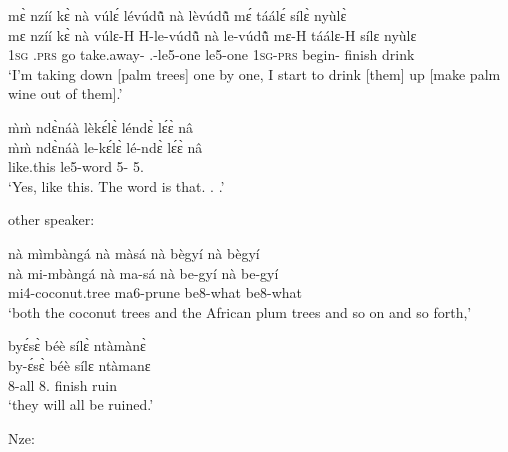 \begin{exe}[(C234)]
\exC\label{78}
  \glll   mɛ̀ nzíí kɛ̀ nà vúlɛ́ lévúdũ̂ nà lèvúdũ̂ mɛ́ táálɛ́ sílɛ̀ nyùlɛ̀ \\
          mɛ nzíí kɛ̀ nà vúlɛ-H H-le-vúdũ̂ nà le-vúdũ̂ mɛ-H táálɛ-H sílɛ nyùlɛ \\
           1\textsc{sg} {\PROG}.\textsc{prs} go {\CONJ} take.away-{\R} {\OBJ}.{\LINK}-le5-one {\COM} le5-one 1\textsc{sg}-\textsc{prs} begin-{\R} finish drink \\
    \trans `I'm taking down [palm trees] one by one, I start to drink [them] up [make palm wine out of them].'
 
\exC\label{79}
  \glll   m̀m̀ ndɛ̀náà lèkɛ́lɛ̀ léndɛ̀ lɛ́ɛ̀ nâ \\
          m̀m̀ ndɛ̀náà le-kɛ́lɛ̀ lé-ndɛ̀ lɛ́ɛ̀ nâ \\
         {\EXCL} like.this  le5-word 5-{\ANA} 5.{\COP} {\COMP} \\
    \trans `Yes, like this. The word is that. . .'
\end{exe}

\noindent other speaker:

\begin{exe}[(C234)]  
\exC\label{80}
  \glll  nà mìmbàngá nà màsá nà bègyí nà bègyí\\
       nà mi-mbàngá nà ma-sá nà be-gyí nà be-gyí\\
           {\CONJ} mi4-coconut.tree {\CONJ} ma6-prune {\CONJ} be8-what {\CONJ} be8-what\\
    \trans `both the coconut trees and the African plum trees and so on and so forth,'
 
\exC\label{81} 
  \glll   byɛ́sɛ̀ béè sílɛ̀ ntàmànɛ̀  \\
      by-ɛ́sɛ̀ béè sílɛ ntàmanɛ \\
           8-all 8.{\FUT} finish ruin \\
    \trans `they will all be ruined.'
\end{exe}

\noindent Nze:

